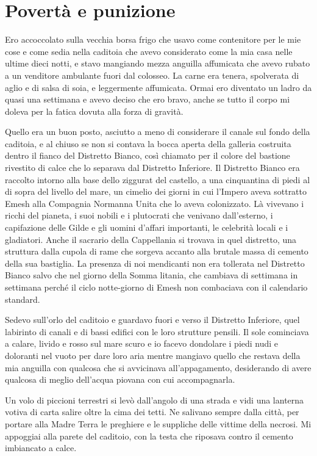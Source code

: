 \chapter{Povertà e punizione}

Ero accoccolato sulla vecchia borsa frigo che usavo come contenitore per
le mie cose e come sedia nella caditoia che avevo considerato come la
mia casa nelle ultime dieci notti, e stavo mangiando mezza anguilla
affumicata che avevo rubato a un venditore ambulante fuori dal colosseo.
La carne era tenera, spolverata di aglio e di salsa di soia, e
leggermente affumicata. Ormai ero diventato un ladro da quasi una
settimana e avevo deciso che ero bravo, anche se tutto il corpo mi
doleva per la fatica dovuta alla forza di gravità.

Quello era un buon posto, asciutto a meno di considerare il canale sul
fondo della caditoia, e al chiuso se non si contava la bocca aperta
della galleria costruita dentro il fianco del Distretto Bianco, così
chiamato per il colore del bastione rivestito di calce che lo separava
dal Distretto Inferiore. Il Distretto Bianco era raccolto intorno alla
base dello ziggurat del castello, a una cinquantina di piedi al di sopra
del livello del mare, un cimelio dei giorni in cui l'Impero aveva
sottratto Emesh alla Compagnia Normanna Unita che lo aveva colonizzato.
Là vivevano i ricchi del pianeta, i suoi nobili e i plutocrati che
venivano dall'esterno, i capifazione delle Gilde e gli uomini d'affari
importanti, le celebrità locali e i gladiatori. Anche il sacrario della
Cappellania si trovava in quel distretto, una struttura dalla cupola di
rame che sorgeva accanto alla brutale massa di cemento della sua
bastiglia. La presenza di noi mendicanti non era tollerata nel Distretto
Bianco salvo che nel giorno della Somma litania, che cambiava di
settimana in settimana perché il ciclo notte-giorno di Emesh non
combaciava con il calendario standard.

Sedevo sull'orlo del caditoio e guardavo fuori e verso il Distretto
Inferiore, quel labirinto di canali e di bassi edifici con le loro
strutture pensili. Il sole cominciava a calare, livido e rosso sul mare
scuro e io facevo dondolare i piedi nudi e doloranti nel vuoto per dare
loro aria mentre mangiavo quello che restava della mia anguilla con
qualcosa che si avvicinava all'appagamento, desiderando di avere
qualcosa di meglio dell'acqua piovana con cui accompagnarla.

Un volo di piccioni terrestri si levò dall'angolo di una strada e vidi
una lanterna votiva di carta salire oltre la cima dei tetti. Ne salivano
sempre dalla città, per portare alla Madre Terra le preghiere e le
suppliche delle vittime della necrosi. Mi appoggiai alla parete del
caditoio, con la testa che riposava contro il cemento imbiancato a
calce.

